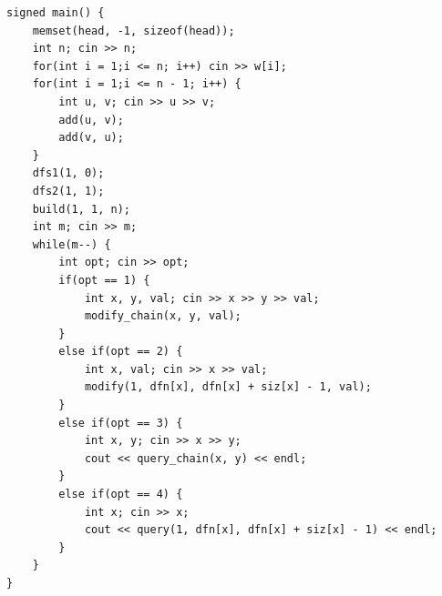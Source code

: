 \documentclass[twoside]{article}
\begin{document}
\begin{lstlisting}
signed main() {
    memset(head, -1, sizeof(head));
    int n; cin >> n;
    for(int i = 1;i <= n; i++) cin >> w[i];
    for(int i = 1;i <= n - 1; i++) {
        int u, v; cin >> u >> v;
        add(u, v);
        add(v, u);
    }
    dfs1(1, 0);
    dfs2(1, 1);
    build(1, 1, n);
    int m; cin >> m;
    while(m--) {
        int opt; cin >> opt;
        if(opt == 1) {
            int x, y, val; cin >> x >> y >> val;
            modify_chain(x, y, val);
        }
        else if(opt == 2) {
            int x, val; cin >> x >> val;
            modify(1, dfn[x], dfn[x] + siz[x] - 1, val);
        }
        else if(opt == 3) {
            int x, y; cin >> x >> y;
            cout << query_chain(x, y) << endl;
        }
        else if(opt == 4) {
            int x; cin >> x;
            cout << query(1, dfn[x], dfn[x] + siz[x] - 1) << endl;
        }
    }
}\end{lstlisting}
\end{document}
